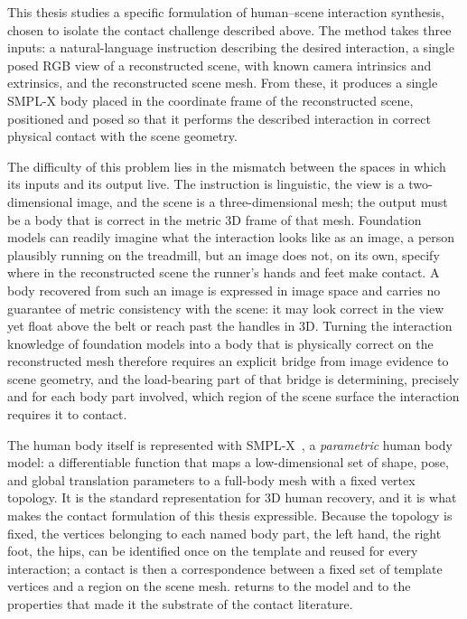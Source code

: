 This thesis studies a specific formulation of human--scene interaction synthesis, chosen to isolate the contact challenge described above. The method takes three inputs: a natural-language instruction describing the desired interaction, a single posed RGB view of a reconstructed scene, with known camera intrinsics and extrinsics, and the reconstructed scene mesh. From these, it produces a single SMPL-X body placed in the coordinate frame of the reconstructed scene, positioned and posed so that it performs the described interaction in correct physical contact with the scene geometry.

The difficulty of this problem lies in the mismatch between the spaces in which its inputs and its output live. The instruction is linguistic, the view is a two-dimensional image, and the scene is a three-dimensional mesh; the output must be a body that is correct in the metric 3D frame of that mesh. Foundation models can readily imagine what the interaction looks like as an image, a person plausibly running on the treadmill, but an image does not, on its own, specify where in the reconstructed scene the runner's hands and feet make contact. A body recovered from such an image is expressed in image space and carries no guarantee of metric consistency with the scene: it may look correct in the view yet float above the belt or reach past the handles in 3D. Turning the interaction knowledge of foundation models into a body that is physically correct on the reconstructed mesh therefore requires an explicit bridge from image evidence to scene geometry, and the load-bearing part of that bridge is determining, precisely and for each body part involved, which region of the scene surface the interaction requires it to contact.

The human body itself is represented with SMPL-X~\cite{pavlakos2019smplx}, a \emph{parametric} human body model: a differentiable function that maps a low-dimensional set of shape, pose, and global translation parameters to a full-body mesh with a fixed vertex topology. It is the standard representation for 3D human recovery, and it is what makes the contact formulation of this thesis expressible. Because the topology is fixed, the vertices belonging to each named body part, the left hand, the right foot, the hips, can be identified once on the template and reused for every interaction; a contact is then a correspondence between a fixed set of template vertices and a region on the scene mesh.  returns to the model and to the properties that made it the substrate of the contact literature.

